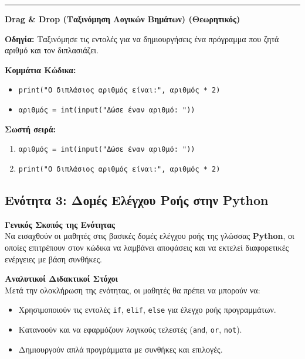 \documentclass[11pt]{report}
\begin{document}
\vspace{1em}
\noindent\rule{\linewidth}{0.4pt}

\vspace{1em}

\textbf{Drag \& Drop (Ταξινόμηση Λογικών Βημάτων) (Θεωρητικός)}

\textbf{Οδηγία:} Ταξινόμησε τις εντολές για να δημιουργήσεις ένα πρόγραμμα που ζητά αριθμό και τον διπλασιάζει.

\textbf{Κομμάτια Κώδικα:}
\begin{itemize}
    \item \texttt{print("Ο διπλάσιος αριθμός είναι:", αριθμός * 2)}
    \item \texttt{αριθμός = int(input("Δώσε έναν αριθμό: "))}
\end{itemize}

\textbf{Σωστή σειρά:}
\begin{enumerate}
    \item \texttt{αριθμός = int(input("Δώσε έναν αριθμό: "))}
    \item \texttt{print("Ο διπλάσιος αριθμός είναι:", αριθμός * 2)}
\end{enumerate}

\subsection{Ενότητα 3: Δομές Ελέγχου Ροής στην Python}

\textbf{Γενικός Σκοπός της Ενότητας} \\[0.5em]
Να εισαχθούν οι μαθητές στις βασικές δομές ελέγχου ροής της γλώσσας \textbf{Python}, οι οποίες επιτρέπουν στον κώδικα να λαμβάνει αποφάσεις και να εκτελεί διαφορετικές ενέργειες με βάση συνθήκες.

\vspace{1em}
\textbf{Αναλυτικοί Διδακτικοί Στόχοι} \\[0.5em]
Μετά την ολοκλήρωση της ενότητας, οι μαθητές θα πρέπει να μπορούν να:

\begin{itemize}
    \item Χρησιμοποιούν τις εντολές \texttt{if}, \texttt{elif}, \texttt{else} για έλεγχο ροής προγραμμάτων.
    \item Κατανοούν και να εφαρμόζουν λογικούς τελεστές (\texttt{and}, \texttt{or}, \texttt{not}).
    \item Δημιουργούν απλά προγράμματα με συνθήκες και επιλογές.
\end{itemize}
\end{document}
